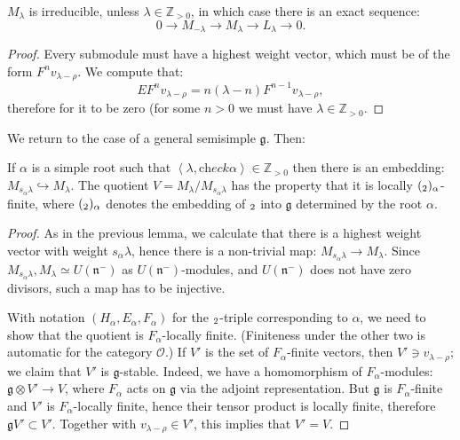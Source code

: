 \begin{lemma}
 $M_\lambda$ is irreducible, unless $\lambda\in \mathbb Z_{>0}$, in which case there is an exact sequence:
$$ 0 \to M_{-\lambda}\to M_\lambda \to L_\lambda \to 0.$$
\end{lemma}

\begin{proof}
 Every submodule must have a highest weight vector, which must be of the form $F^nv_{\lambda-\rho}$. We compute that:
$$ EF^n v_{\lambda-\rho} = n (\lambda-n) F^{n-1} v_{\lambda-\rho},$$
therefore for it to be zero (for some $n>0$ we must have $\lambda\in \mathbb Z_{>0}$.
\end{proof}

We return to the case of a general semisimple $\mathfrak g$. Then:

\begin{lemma}
 If $\alpha$ is a simple root such that $\left<\lambda,\text{ch}eck\alpha\right>\in \mathbb Z_{>0}$ then there is an embedding: $M_{s_\alpha\lambda}\hookrightarrow M_\lambda$. The quotient $V=M_\lambda/M_{s_\alpha\lambda}$ has the property that it is locally $(\sl_2)_\alpha$-finite, where $(\sl_2)_\alpha$ denotes the embedding of $\sl_2$ into $\mathfrak g$ determined by the root $\alpha$.
\end{lemma}

\begin{proof}
 As in the previous lemma, we calculate that there is a highest weight vector with weight $s_\alpha\lambda$, hence there is a non-trivial map: $M_{s_\alpha\lambda}\to M_\lambda$. Since $M_{s_\alpha\lambda}, M_\lambda \simeq U(\mathfrak n^-)$ as $U(\mathfrak n^-)$-modules, and $U(\mathfrak n^-)$ does not have zero divisors, such a map has to be injective.

 With notation $(H_\alpha,E_\alpha,F_\alpha)$ for the $\sl_2$-triple corresponding to $\alpha$, we need to show that the quotient is $F_\alpha$-locally finite. (Finiteness under the other two is automatic for the category $\mathcal O$.) If $V'$ is the set of $F_\alpha$-finite vectors, then $V'\ni v_{\lambda-\rho}$; we claim that $V'$ is $\mathfrak g$-stable. Indeed, we have a homomorphism of $F_\alpha$-modules: $\mathfrak g\otimes V'\to V$, where $F_\alpha$ acts on $\mathfrak g$ via the adjoint representation. But $\mathfrak g$ is $F_\alpha$-finite and $V'$ is $F_\alpha$-locally finite, hence their tensor product is locally finite, therefore $\mathfrak gV'\subset V'$. Together with $v_{\lambda-\rho}\in V'$, this implies that $V'=V$.
\end{proof}


